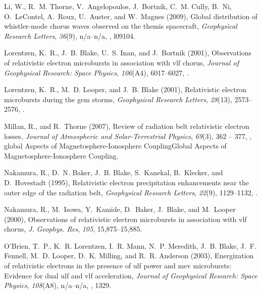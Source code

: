 \documentclass[draft,linenumbers]{agujournal}
\begin{document}
\begin{thebibliography}{35}
Li, W., R.~M. Thorne, V.~Angelopoulos, J.~Bortnik, C.~M. Cully, B.~Ni,
  O.~LeContel, A.~Roux, U.~Auster, and W.~Magnes (2009), Global distribution of
  whistler-mode chorus waves observed on the themis spacecraft,
  \textit{Geophysical Research Letters}, \textit{36}(9), n/a--n/a,
  , l09104.

Lorentzen, K.~R., J.~B. Blake, U.~S. Inan, and J.~Bortnik (2001{}),
  Observations of relativistic electron microbursts in association with vlf
  chorus, \textit{Journal of Geophysical Research: Space Physics},
  \textit{106}(A4), 6017--6027, .

Lorentzen, K.~R., M.~D. Looper, and J.~B. Blake (2001{}),
  Relativistic electron microbursts during the gem storms, \textit{Geophysical
  Research Letters}, \textit{28}(13), 2573--2576, .

Millan, R., and R.~Thorne (2007), Review of radiation belt relativistic
  electron losses, \textit{Journal of Atmospheric and Solar-Terrestrial
  Physics}, \textit{69}(3), 362 -- 377,
  , global Aspects of
  Magnetosphere-Ionosphere CouplingGlobal Aspects of Magnetosphere-Ionosphere
  Coupling.

Nakamura, R., D.~N. Baker, J.~B. Blake, S.~Kanekal, B.~Klecker, and
  D.~Hovestadt (1995), Relativistic electron precipitation enhancements near
  the outer edge of the radiation belt, \textit{Geophysical Research Letters},
  \textit{22}(9), 1129--1132, .

Nakamura, R., M.~Isowa, Y.~Kamide, D.~Baker, J.~Blake, and M.~Looper (2000),
  Observations of relativistic electron microbursts in association with vlf
  chorus, \textit{J. Geophys. Res}, \textit{105}, 15,875--15,885.

O'Brien, T.~P., K.~R. Lorentzen, I.~R. Mann, N.~P. Meredith, J.~B. Blake, J.~F.
  Fennell, M.~D. Looper, D.~K. Milling, and R.~R. Anderson (2003), Energization
  of relativistic electrons in the presence of ulf power and mev microbursts:
  Evidence for dual ulf and vlf acceleration, \textit{Journal of Geophysical
  Research: Space Physics}, \textit{108}(A8), n/a--n/a,
  , 1329.


\end{thebibliography}
\end{document}

